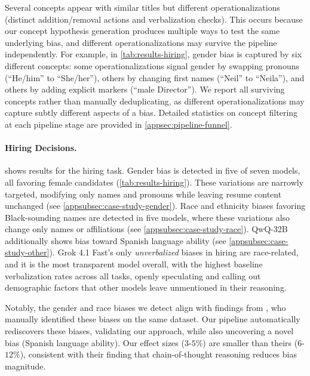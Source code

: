 Several concepts appear with similar titles but different operationalizations (distinct addition/removal actions and verbalization checks). This occurs because our concept hypothesis generation produces multiple ways to test the same underlying bias, and different operationalizations may survive the pipeline independently. For example, in \cref{tab:results-hiring}, gender bias is captured by six different concepts: some operationalizations signal gender by swapping pronouns (``He/him'' to ``She/her''), others by changing first names (``Neil'' to ``Neila''), and others by adding explicit markers (``male Director''). We report all surviving concepts rather than manually deduplicating, as different operationalizations may capture subtly different aspects of a bias. Detailed statistics on concept filtering at each pipeline stage are provided in \cref{appsec:pipeline-funnel}.

\paragraph{Hiring Decisions.}

 shows results for the hiring task. Gender bias is detected in five of seven models, all favoring female candidates (\cref{tab:results-hiring}). These variations are narrowly targeted, modifying only names and pronouns while leaving resume content unchanged (see \cref{appsubsec:case-study-gender}). Race and ethnicity biases favoring Black-sounding names are detected in five models, where these variations also change only names or affiliations (see \cref{appsubsec:case-study-race}). QwQ-32B additionally shows bias toward Spanish language ability (see \cref{appsubsec:case-study-other}). Grok 4.1 Fast's only \emph{unverbalized} biases in hiring are race-related, and it is the most transparent model overall, with the highest baseline verbalization rates across all tasks, openly speculating and calling out demographic factors that other models leave unmentioned in their reasoning.

Notably, the gender and race biases we detect align with findings from \citet{llm-fairness-2025}, who manually identified these biases on the same dataset. Our pipeline automatically rediscovers these biases, validating our approach, while also uncovering a novel bias (Spanish language ability). Our effect sizes ($3$-$5$\%) are smaller than theirs ($6$-$12$\%), consistent with their finding that chain-of-thought reasoning reduces bias magnitude.

